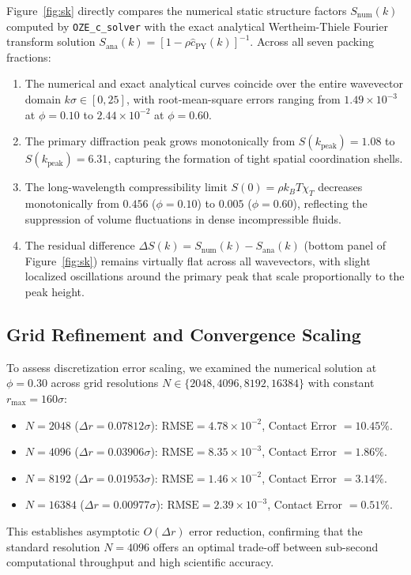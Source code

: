 \documentclass[11pt,a4paper]{article}
\begin{document}
Figure~\ref{fig:sk} directly compares the numerical static structure factors $S_{\text{num}}(k)$ computed by \texttt{OZE\_c\_solver} with the exact analytical Wertheim-Thiele Fourier transform solution $S_{\text{ana}}(k) = [1 - \rho \hat{c}_{\text{PY}}(k)]^{-1}$. Across all seven packing fractions:
\begin{enumerate}
    \item The numerical and exact analytical curves coincide over the entire wavevector domain $k\sigma \in [0, 25]$, with root-mean-square errors ranging from $1.49 \times 10^{-3}$ at $\phi=0.10$ to $2.44 \times 10^{-2}$ at $\phi=0.60$.
    \item The primary diffraction peak grows monotonically from $S(k_{\text{peak}}) = 1.08$ to $S(k_{\text{peak}}) = 6.31$, capturing the formation of tight spatial coordination shells.
    \item The long-wavelength compressibility limit $S(0) = \rho k_B T \chi_T$ decreases monotonically from $0.456$ ($\phi=0.10$) to $0.005$ ($\phi=0.60$), reflecting the suppression of volume fluctuations in dense incompressible fluids.
    \item The residual difference $\Delta S(k) = S_{\text{num}}(k) - S_{\text{ana}}(k)$ (bottom panel of Figure~\ref{fig:sk}) remains virtually flat across all wavevectors, with slight localized oscillations around the primary peak that scale proportionally to the peak height.
\end{enumerate}

\subsection{Grid Refinement and Convergence Scaling}

To assess discretization error scaling, we examined the numerical solution at $\phi = 0.30$ across grid resolutions $N \in \{2048, 4096, 8192, 16384\}$ with constant $r_{\max} = 160\sigma$:
\begin{itemize}
    \item $N = 2048$ ($\Delta r = 0.07812\sigma$): $\text{RMSE} = 4.78 \times 10^{-2}$, Contact Error $= 10.45\%$.
    \item $N = 4096$ ($\Delta r = 0.03906\sigma$): $\text{RMSE} = 8.35 \times 10^{-3}$, Contact Error $= 1.86\%$.
    \item $N = 8192$ ($\Delta r = 0.01953\sigma$): $\text{RMSE} = 1.46 \times 10^{-2}$, Contact Error $= 3.14\%$.
    \item $N = 16384$ ($\Delta r = 0.00977\sigma$): $\text{RMSE} = 2.39 \times 10^{-3}$, Contact Error $= 0.51\%$.
\end{itemize}
This establishes asymptotic $O(\Delta r)$ error reduction, confirming that the standard resolution $N = 4096$ offers an optimal trade-off between sub-second computational throughput and high scientific accuracy.
\end{document}
